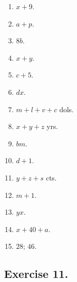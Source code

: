 \documentclass{book}
\begin{document}
\begin{enumerate}

\item $x + 9$.

\item $a + p$.

\item $8b$.

\item $x + y$.

\item $c + 5$.

\item $dx$.

\item $m + l + v + c$ dols.

\item $x + y + z$ yrs.

\item $bm$.

\item $d + 1$.

\item $y + z + s$ cts.

\item $m + 1$.

\item $yx$.

\item $x + 40 + a$.

\item $28$; $46$.
\end{enumerate}

\subsection*{Exercise 11.}
\end{document}

